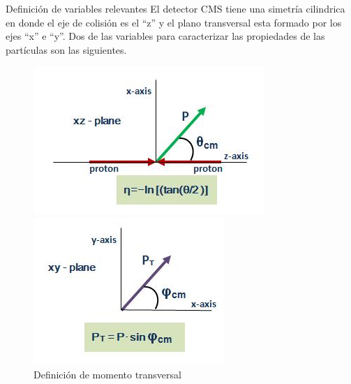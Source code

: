 \begin{frame}{Definici\'on de variables relevantes}
El detector CMS tiene una simetr\'ia cilindrica en donde el eje de colisi\'on es el ``z'' y el plano transversal esta formado por los ejes ``x'' e ``y''. Dos de las variables para caracterizar las propiedades de las part\'iculas son las siguientes. 
\begin{figure}[ht]
\begin{minipage}[b]{0.45\linewidth}
\centering
\includegraphics[width=\textwidth]{Imag/pseudorapidity.PNG}
\caption{Definici\'on de pseudorapidez}
\end{minipage}
\hspace{0.5cm}
\begin{minipage}[b]{0.45\linewidth}
\centering
\includegraphics[width=\textwidth]{Imag/pt.PNG}
\caption{Definici\'on de momento transversal}
\end{minipage}
\end{figure} 

\end{frame}



